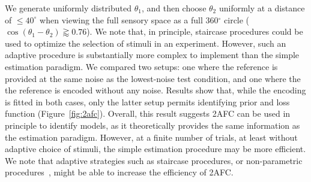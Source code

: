 \documentclass[si.tex]{subfiles}
\begin{document}
We generate uniformly distributed $\theta_1$, and then choose $\theta_2$ uniformly at a distance of $\leq 40^\circ$ when viewing the full sensory space as a full 360$^\circ$ circle ($\cos(\theta_1-\theta_2) \gtrapprox 0.76$).
We note that, in principle, staircase procedures could be used to optimize the selection of stimuli in an experiment. However, such an adaptive procedure is substantially more complex to implement than the simple estimation paradigm.
We compared two setups: one where the reference is provided at the same noise as the lowest-noise test condition, and one where the the reference is encoded without any noise. Results show that, while the encoding is fitted in both cases, only the latter setup permits identifying prior and loss function (Figure~\ref{fig:2afc}). Overall, this result suggests 2AFC can be used in principle to identify models, as it theoretically provides the same information as the estimation paradigm. However, at a finite number of trials, at least without adaptive choice of stimuli, the simple estimation procedure may be more efficient.
We note that adaptive strategies such as staircase procedures, or non-parametric procedures~\cite{Hong2026Comprehensive}, might be able to increase the efficiency of 2AFC.
\end{document}
